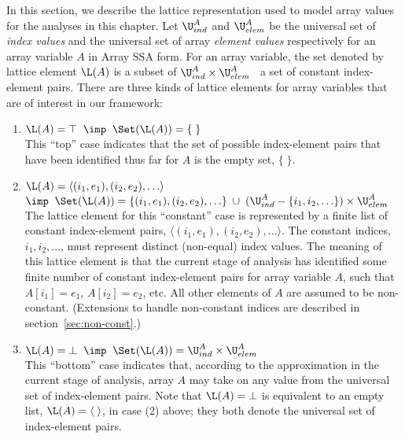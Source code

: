 In this section, we describe the lattice representation used to model
array values for the analyses in this chapter.
Let $\U^A_{ind}$ and $\U^A_{elem}$ be the universal set of {\it index values}
and the universal set of array {\it element values} respectively
for an array variable $A$
in Array SSA form.
For an array variable,
the set denoted by
lattice element $\L(A)$ is a subset of $\U^A_{ind} \times \U^A_{elem}$ \ie\
a set of constant index-element pairs.
There are three kinds of lattice elements for array variables that are of
interest in our framework:
\begin{enumerate}
\item $\L(A) = \top \;\;\imp\;\; \Set(\L(A)) = \{\;\}$\\
This ``top'' case indicates that the set of possible index-element
pairs
that have been identified thus far for $A$ is the empty set, $\{\;\}$.


\item $\L(A) = \langle(i_1,e_1), (i_2,e_2), \ldots\rangle$\\
$\imp\;\; \Set(\L(A)) = \{ (i_1,e_1), (i_2,e_2), \ldots \} \;\cup\;
(\U^A_{ind}-\{i_1,i_2,\ldots\})\times \U^A_{elem}$\\
The lattice element for this ``constant'' case is represented by a finite
list
of constant index-element pairs, $\langle(i_1,e_1), (i_2,e_2), \ldots\rangle$.
The constant indices, $i_1, i_2, \ldots$, must represent distinct (non-equal)
index values.  
The meaning of this lattice element is
that the current stage of analysis
has identified some finite number of constant index-element pairs
for array variable $A$, such
that $A[i_1] = e_1$, $A[i_2] = e_2$, etc.
All other elements of $A$ are assumed to be non-constant.
(Extensions to handle non-constant indices are
described in section~\ref{sec:non-const}.)

\item $\L(A) = \bot \;\;\imp\;\; \Set(\L(A)) =  \U^A_{ind} \times \U^A_{elem}$\\
This ``bottom''
case indicates that, according to
the approximation in the current stage of analysis, array $A$ may take on any
value from the universal set of index-element pairs.
Note that $\L(A)=\bot$ is equivalent to an empty list,
$\L(A)=\langle \; \rangle$, in case (2) above; they both 
denote the universal set of index-element pairs.
\end{enumerate}

